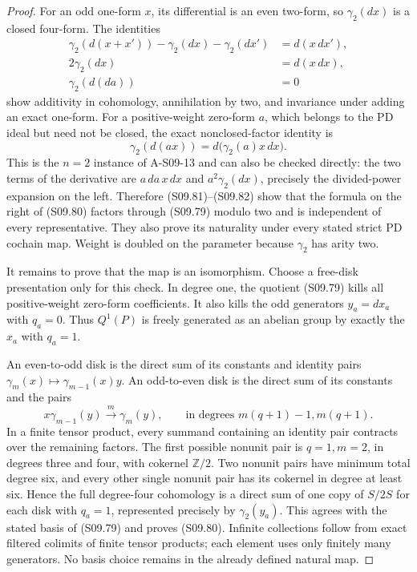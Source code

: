 \begin{proof}
For an odd one-form $x$, its differential is an even
two-form, so $\gamma_2(dx)$ is a closed four-form.
The identities
\[
 \begin{split}
 \gamma_2(d(x+x'))-\gamma_2(dx)-\gamma_2(dx')
                          &=d(x\,dx'),\\
 2\gamma_2(dx)&=d(x\,dx),\\
 \gamma_2(d(da))&=0
 \end{split}                                                   \tag{S09.81}
\]
show additivity in cohomology, annihilation by two,
and invariance under adding an exact one-form.
For a positive-weight zero-form $a$, which belongs
to the PD ideal but need not be closed, the exact
nonclosed-factor identity is
\[
              \gamma_2(d(a x))
                         =d\bigl(\gamma_2(a)x\,dx\bigr).
 \tag{S09.82}
\]
This is the $n=2$ instance of A-S09-13 and can also
be checked directly: the two terms of the derivative
are $a\,da\,x\,dx$ and $a^2\gamma_2(dx)$, precisely
the divided-power expansion on the left.  Therefore
(S09.81)--(S09.82) show that the formula on the
right of (S09.80) factors through (S09.79) modulo
two and is independent of every representative.
They also prove its naturality under every stated
strict PD cochain map.  Weight is doubled on the
parameter because $\gamma_2$ has arity two.

It remains to prove that the map is an isomorphism.
Choose a free-disk presentation only for this check.
In degree one, the quotient (S09.79) kills all
positive-weight zero-form coefficients.  It also
kills the odd generators $y_a=dx_a$ with $q_a=0$.
Thus $Q^1(P)$ is freely generated as an abelian
group by exactly the $x_a$ with $q_a=1$.

An even-to-odd disk is the direct sum of its constants
and identity pairs
$\gamma_m(x)\mapsto\gamma_{m-1}(x)y$.
An odd-to-even disk is the direct sum of its constants
and the pairs
\[
 x\gamma_{m-1}(y)\xrightarrow{\ m\ }\gamma_m(y),
          \qquad\text{in degrees }m(q+1)-1,m(q+1).
 \tag{S09.83}
\]
In a finite tensor product, every summand containing
an identity pair contracts over the remaining factors.
The first possible nonunit pair is $q=1,m=2$, in
degrees three and four, with cokernel $\mathbb Z/2$.
Two nonunit pairs have minimum total degree six,
and every other single nonunit pair has its cokernel
in degree at least six.  Hence the full degree-four
cohomology is a direct sum of one copy of $S/2S$
for each disk with $q_a=1$, represented precisely
by $\gamma_2(y_a)$.  This agrees with the stated
basis of (S09.79) and proves (S09.80).  Infinite
collections follow from exact filtered colimits
of finite tensor products; each element uses only
finitely many generators.  No basis choice remains
in the already defined natural map.
\end{proof}

